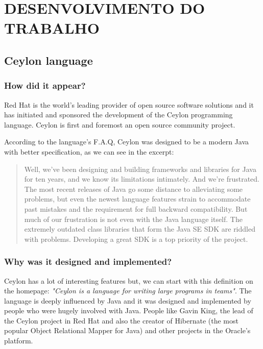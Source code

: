 \documentclass{abnt}
\begin{document}

\chapter{DESENVOLVIMENTO DO TRABALHO}

\section{Ceylon language}

\subsection{How did it appear?}

Red Hat\cite{1_1} is the world's leading provider of open source software
solutions and it has initiated and sponsored\cite{1_2} the development
of the Ceylon programming language. Ceylon is first and foremost an open source
community project.

According to the language's F.A.Q\cite{1_3}, Ceylon was designed to be a
modern Java with better specification, as we can see in the excerpt:

\begin{quote}
Well, we've been designing and building frameworks and libraries for Java for
ten years, and we know its limitations intimately. And we're frustrated. The
most recent releases of Java go some distance to alleviating some problems,
but even the newest language features strain to accommodate past mistakes and
the requirement for full backward compatibility.
But much of our frustration is not even with the Java language itself. The
extremely outdated class libraries that form the Java SE SDK are riddled with
problems. Developing a great SDK is a top priority of the project.
\end{quote}

\subsection{Why was it designed and implemented?}

Ceylon has a lot of interesting features but, we can start with this
definition on the homepage\cite{1_4}: \textit{"Ceylon is a language for writing
large programs in teams"}. The language is deeply influenced by Java and it was
designed and implemented by people who were hugely involved with Java. People
like Gavin King, the lead of the Ceylon project in Red Hat and also the creator
of Hibernate\cite{1_5} (the most popular Object Relational Mapper for Java) and
other projects in the Oracle's platform.
\end{document}
